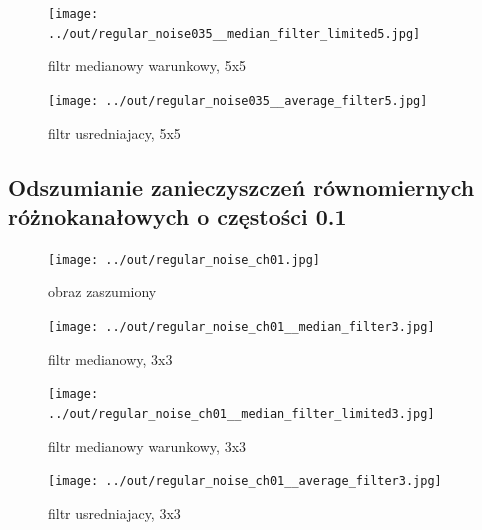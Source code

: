 \documentclass[a4paper,12pt]{article}
\begin{document}
\begin{figure}[h!]
\begin{minipage}[t]{7.5cm}
\begin{center}
\texttt{[image: ../out/regular\_noise035\_\_median\_filter\_limited5.jpg]}
\caption{filtr medianowy warunkowy, 5x5}
\end{center}
\end{minipage}
\hfill
\begin{minipage}[t]{7.5cm}
\begin{center}
\texttt{[image: ../out/regular\_noise035\_\_average\_filter5.jpg]}
\caption{filtr usredniajacy, 5x5}
\end{center}
\end{minipage}
\end{figure}


\newpage
\subsection{Odszumianie zanieczyszczeń równomiernych różnokanałowych o częstości 0.1}
\begin{figure}[h!]
\begin{minipage}[t]{7.5cm}
\begin{center}
\texttt{[image: ../out/regular\_noise\_ch01.jpg]}
\caption{obraz zaszumiony}
\end{center}
\end{minipage}
\hfill
\begin{minipage}[t]{7.5cm}
\begin{center}
\texttt{[image: ../out/regular\_noise\_ch01\_\_median\_filter3.jpg]}
\caption{filtr medianowy, 3x3}
\end{center}
\end{minipage}
\end{figure}

\begin{figure}[h!]
\begin{minipage}[t]{7.5cm}
\begin{center}
\texttt{[image: ../out/regular\_noise\_ch01\_\_median\_filter\_limited3.jpg]}
\caption{filtr medianowy warunkowy, 3x3}
\end{center}
\end{minipage}
\hfill
\begin{minipage}[t]{7.5cm}
\begin{center}
\texttt{[image: ../out/regular\_noise\_ch01\_\_average\_filter3.jpg]}
\caption{filtr usredniajacy, 3x3}
\end{center}
\end{minipage}
\end{figure}
\end{document}
